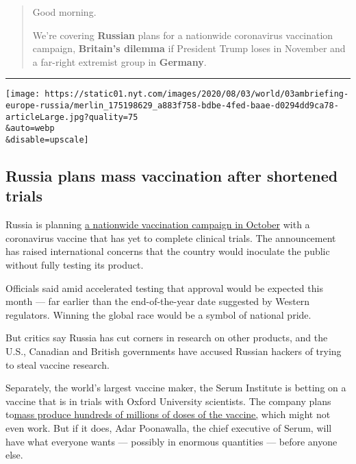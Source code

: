 \begin{quote}
Good morning.

We're covering \textbf{Russian} plans for a nationwide coronavirus
vaccination campaign, \textbf{Britain's dilemma} if President Trump
loses in November and a far-right extremist group in \textbf{Germany}.
\end{quote}

\begin{center}\rule{0.5\linewidth}{\linethickness}\end{center}

\texttt{[image: https://static01.nyt.com/images/2020/08/03/world/03ambriefing-europe-russia/merlin\_175198629\_a883f758-bdbe-4fed-baae-d0294dd9ca78-articleLarge.jpg?quality=75\\\&auto=webp\\\&disable=upscale]}

\hypertarget{russia-plans-mass-vaccination-after-shortened-trials}{%
\subsection{Russia plans mass vaccination after shortened
trials}\label{russia-plans-mass-vaccination-after-shortened-trials}}

Russia is planning
\href{https://www.nytimes.com/2020/08/02/world/europe/russia-trials-vaccine-October.html}{a
nationwide vaccination campaign in October} with a coronavirus vaccine
that has yet to complete clinical trials. The announcement has raised
international concerns that the country would inoculate the public
without fully testing its product.

Officials said amid accelerated testing that approval would be expected
this month --- far earlier than the end-of-the-year date suggested by
Western regulators. Winning the global race would be a symbol of
national pride.

But critics say Russia has cut corners in research on other products,
and the U.S., Canadian and British governments have accused Russian
hackers of trying to steal vaccine research.

Separately, the world's largest vaccine maker, the Serum Institute is
betting on a vaccine that is in trials with Oxford University
scientists. The company plans
to\href{https://www.nytimes.com/2020/08/01/world/asia/coronavirus-vaccine-india.html}{mass
produce hundreds of millions of doses of the vaccine,} which might not
even work. But if it does, Adar Poonawalla, the chief executive of
Serum, will have what everyone wants --- possibly in enormous quantities
--- before anyone else.

